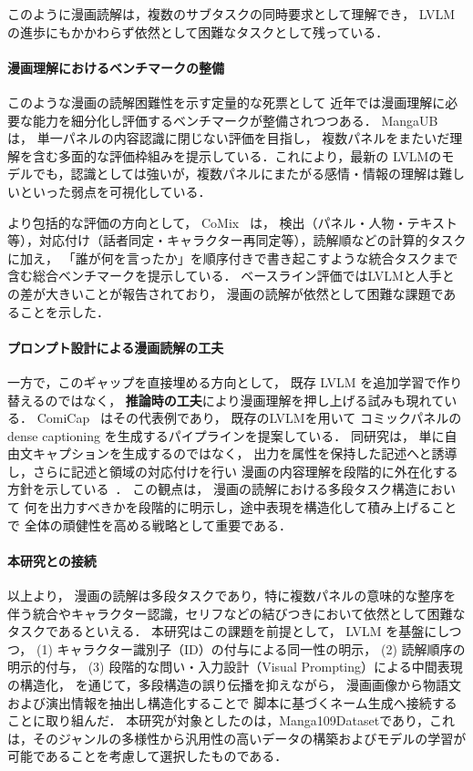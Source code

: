 \documentclass[a4j,12pt,dvipdfmx]{jsreport}
\begin{document}
このように漫画読解は，複数のサブタスクの同時要求として理解でき，
LVLM の進歩にもかかわらず依然として困難なタスクとして残っている．

\vspace{0.5em}
\paragraph{漫画理解におけるベンチマークの整備}
このような漫画の読解困難性を示す定量的な死票として
近年では漫画理解に必要な能力を細分化し評価するベンチマークが整備されつつある．
MangaUB~\cite{ikuta_mangaub_2025} は，
単一パネルの内容認識に閉じない評価を目指し，
複数パネルをまたいだ理解を含む多面的な評価枠組みを提示している．これにより，最新の LVLMのモデルでも，認識としては強いが，複数パネルにまたがる感情・情報の理解は難しいといった弱点を可視化している．

より包括的な評価の方向として，
CoMix~\cite{vivoli_comix_2024-1} は，
検出（パネル・人物・テキスト等），対応付け（話者同定・キャラクター再同定等），読解順などの計算的タスクに加え，
「誰が何を言ったか」を順序付きで書き起こすような統合タスクまで含む総合ベンチマークを提示している．
ベースライン評価ではLVLMと人手との差が大きいことが報告されており，
漫画の読解が依然として困難な課題であることを示した．

\vspace{0.5em}
\paragraph{プロンプト設計による漫画読解の工夫}
一方で，このギャップを直接埋める方向として，
既存 LVLM を追加学習で作り替えるのではなく，
\textbf{推論時の工夫}により漫画理解を押し上げる試みも現れている．
ComiCap~\cite{vivoli2024comiccap} はその代表例であり，
既存のLVLMを用いて
コミックパネルの dense captioning を生成するパイプラインを提案している．
同研究は，
単に自由文キャプションを生成するのではなく，
出力を属性を保持した記述へと誘導し，さらに記述と領域の対応付けを行い
漫画の内容理解を段階的に外在化する方針を示している~\cite{vivoli2024comiccap}．
この観点は，
漫画の読解における多段タスク構造において
何を出力すべきかを段階的に明示し，途中表現を構造化して積み上げることで
全体の頑健性を高める戦略として重要である．

\vspace{0.5em}
\paragraph{本研究との接続}
以上より，
漫画の読解は多段タスクであり，特に複数パネルの意味的な整序を伴う統合やキャラクター認識，セリフなどの結びつきにおいて依然として困難なタスクであるといえる．
本研究はこの課題を前提として，
LVLM を基盤にしつつ，
(1) キャラクター識別子（ID）の付与による同一性の明示，
(2) 読解順序の明示的付与，
(3) 段階的な問い・入力設計（Visual Prompting）による中間表現の構造化，
を通じて，多段構造の誤り伝播を抑えながら，
漫画画像から物語文および演出情報を抽出し構造化することで
脚本に基づくネーム生成へ接続することに取り組んだ．
本研究が対象としたのは，Manga109Datasetであり，これは，そのジャンルの多様性から汎用性の高いデータの構築およびモデルの学習が可能であることを考慮して選択したものである．

\ifdefined\ismain\else
   \printbibliography[title=参考文献]
\fi
\end{document}
